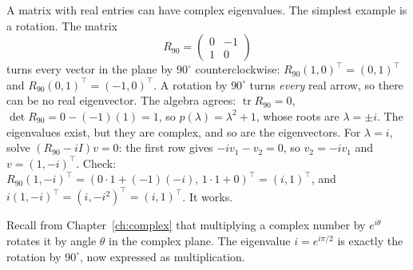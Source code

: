 A matrix with real entries can have complex eigenvalues. The simplest example is a rotation. The matrix
\begin{equation}
R_{90}=\begin{pmatrix}0&-1\\1&0\end{pmatrix}
\end{equation}
turns every vector in the plane by $90^\circ$ counterclockwise: $R_{90}(1,0)^\top=(0,1)^\top$ and $R_{90}(0,1)^\top=(-1,0)^\top$. A rotation by $90^\circ$ turns \emph{every} real arrow, so there can be no real eigenvector. The algebra agrees: $\operatorname{tr}R_{90}=0$, $\det R_{90}=0-(-1)(1)=1$, so $p(\lambda)=\lambda^2+1$, whose roots are $\lambda=\pm i$. The eigenvalues exist, but they are complex, and so are the eigenvectors. For $\lambda=i$, solve $(R_{90}-iI)v=0$: the first row gives $-iv_1-v_2=0$, so $v_2=-iv_1$ and $v=(1,-i)^\top$. Check: $R_{90}(1,-i)^\top=(0\cdot1+(-1)(-i),\,1\cdot1+0)^\top=(i,1)^\top$, and $i(1,-i)^\top=(i,-i^2)^\top=(i,1)^\top$. It works.

Recall from Chapter~\ref{ch:complex} that multiplying a complex number by $e^{i\theta}$ rotates it by angle $\theta$ in the complex plane. The eigenvalue $i=e^{i\pi/2}$ is exactly the rotation by $90^\circ$, now expressed as multiplication.

